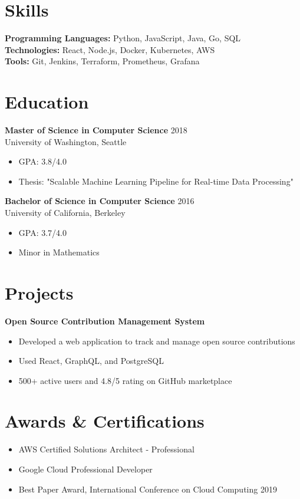 \documentclass[11pt,a4paper]{article}
\begin{document}
\section{Skills}
\textbf{Programming Languages:} Python, JavaScript, Java, Go, SQL\\
\textbf{Technologies:} React, Node.js, Docker, Kubernetes, AWS\\
\textbf{Tools:} Git, Jenkins, Terraform, Prometheus, Grafana

\section{Education}
\textbf{Master of Science in Computer Science} \hfill 2018\\
University of Washington, Seattle
\begin{itemize}[leftmargin=*]
    \item GPA: 3.8/4.0
    \item Thesis: "Scalable Machine Learning Pipeline for Real-time Data Processing"
\end{itemize}

\textbf{Bachelor of Science in Computer Science} \hfill 2016\\
University of California, Berkeley
\begin{itemize}[leftmargin=*]
    \item GPA: 3.7/4.0
    \item Minor in Mathematics
\end{itemize}

\section{Projects}
\textbf{Open Source Contribution Management System}
\begin{itemize}[leftmargin=*]
    \item Developed a web application to track and manage open source contributions
    \item Used React, GraphQL, and PostgreSQL
    \item 500+ active users and 4.8/5 rating on GitHub marketplace
\end{itemize}

\section{Awards \& Certifications}
\begin{itemize}[leftmargin=*]
    \item AWS Certified Solutions Architect - Professional
    \item Google Cloud Professional Developer
    \item Best Paper Award, International Conference on Cloud Computing 2019
\end{itemize}
\end{document}
